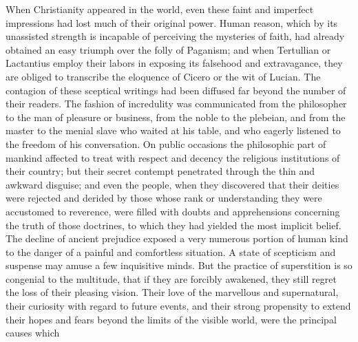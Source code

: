 

When Christianity appeared in the world, even these faint and
imperfect impressions had lost much of their original power.
Human reason, which by its unassisted strength is incapable of
perceiving the mysteries of faith, had already obtained an easy
triumph over the folly of Paganism; and when Tertullian or
Lactantius employ their labors in exposing its falsehood and
extravagance, they are obliged to transcribe the eloquence of
Cicero or the wit of Lucian. The contagion of these sceptical
writings had been diffused far beyond the number of their
readers. The fashion of incredulity was communicated from the
philosopher to the man of pleasure or business, from the noble to
the plebeian, and from the master to the menial slave who waited
at his table, and who eagerly listened to the freedom of his
conversation. On public occasions the philosophic part of mankind
affected to treat with respect and decency the religious
institutions of their country; but their secret contempt
penetrated through the thin and awkward disguise; and even the
people, when they discovered that their deities were rejected and
derided by those whose rank or understanding they were accustomed
to reverence, were filled with doubts and apprehensions
concerning the truth of those doctrines, to which they had
yielded the most implicit belief. The decline of ancient
prejudice exposed a very numerous portion of human kind to the
danger of a painful and comfortless situation. A state of
scepticism and suspense may amuse a few inquisitive minds. But
the practice of superstition is so congenial to the multitude,
that if they are forcibly awakened, they still regret the loss of
their pleasing vision. Their love of the marvellous and
supernatural, their curiosity with regard to future events, and
their strong propensity to extend their hopes and fears beyond
the limits of the visible world, were the principal causes which
